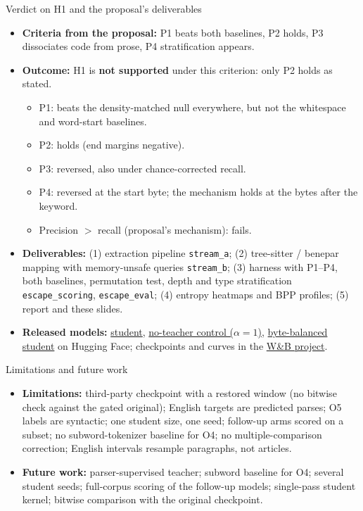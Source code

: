 \documentclass[aspectratio=169,11pt]{beamer}
\newcommand{\hl}[1]{\textcolor{acc}{\textbf{#1}}}
\begin{document}
\begin{frame}{Verdict on H1 and the proposal's deliverables}
\begin{itemize}
\item \textbf{Criteria from the proposal:} P1 beats both baselines, P2 holds, P3 dissociates code from prose, P4 stratification appears.
\item \textbf{Outcome:} H1 is \hl{not supported} under this criterion: only P2 holds as stated.
  \begin{itemize}
  \item P1: beats the density-matched null everywhere, but not the whitespace and word-start baselines.
  \item P2: holds (end margins negative).
  \item P3: reversed, also under chance-corrected recall.
  \item P4: reversed at the start byte; the mechanism holds at the bytes after the keyword.
  \item Precision $>$ recall (proposal's mechanism): fails.
  \end{itemize}
\item \textbf{Deliverables:} (1) extraction pipeline \texttt{stream\_a}; (2) tree-sitter / benepar mapping with memory-unsafe queries \texttt{stream\_b}; (3) harness with P1--P4, both baselines, permutation test, depth and type stratification \texttt{escape\_scoring}, \texttt{escape\_eval}; (4) entropy heatmaps and BPP profiles; (5) report and these slides.
\item \textbf{Released models:} \href{https://huggingface.co/Devatri/escape-blt-entropy-student}{student}, \href{https://huggingface.co/Devatri/escape-blt-entropy-student-alpha1}{no-teacher control ($\alpha{=}1$)}, \href{https://huggingface.co/Devatri/escape-blt-entropy-student-balanced}{byte-balanced student} on Hugging Face; checkpoints and curves in the \href{https://forge.coreweave.com/wandb/kanhadivyansh123-iiit-hyderabad/escape-blt-patching}{W\&B project}.
\end{itemize}
\end{frame}

\begin{frame}{Limitations and future work}
\begin{itemize}
\item \textbf{Limitations:} third-party checkpoint with a restored window (no bitwise check against the gated original); English targets are predicted parses; O5 labels are syntactic; one student size, one seed; follow-up arms scored on a subset; no subword-tokenizer baseline for O4; no multiple-comparison correction; English intervals resample paragraphs, not articles.
\item \textbf{Future work:} parser-supervised teacher; subword baseline for O4; several student seeds; full-corpus scoring of the follow-up models; single-pass student kernel; bitwise comparison with the original checkpoint.
\end{itemize}
\end{frame}
\end{document}
